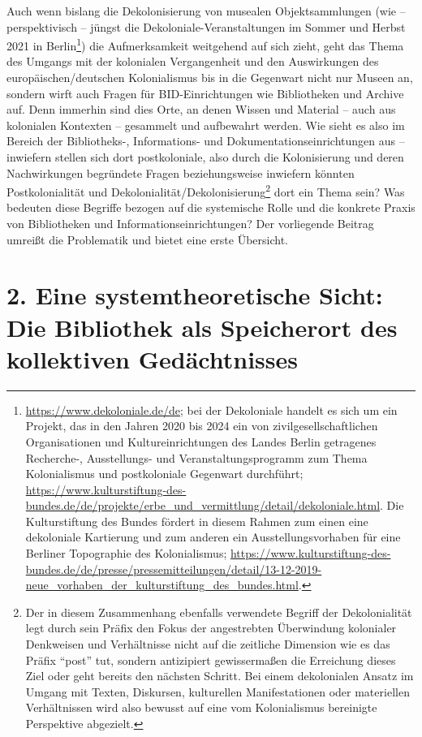 \documentclass[a4paper,
fontsize=11pt,
oneside,
numbers=noperiodatend,
parskip=half-,
bibliography=totoc,
final
]{scrartcl}
\begin{document}
Auch wenn bislang die Dekolonisierung von musealen Objektsammlungen (wie
-- perspektivisch -- jüngst die Dekoloniale-Veranstaltungen im Sommer
und Herbst 2021 in Berlin\footnote{\url{https://www.dekoloniale.de/de};
  bei der Dekoloniale handelt es sich um ein Projekt, das in den Jahren
  2020 bis 2024 ein von zivilgesellschaftlichen Organisationen und
  Kultureinrichtungen des Landes Berlin getragenes Recherche-,
  Ausstellungs- und Veranstaltungsprogramm zum Thema Kolonialismus und
  postkoloniale Gegenwart durchführt;
  \url{https://www.kulturstiftung-des-bundes.de/de/projekte/erbe_und_vermittlung/detail/dekoloniale.html}.
  Die Kulturstiftung des Bundes fördert in diesem Rahmen zum einen eine
  dekoloniale Kartierung und zum anderen ein Ausstellungsvorhaben für
  eine Berliner Topographie des Kolonialismus;
  \url{https://www.kulturstiftung-des-bundes.de/de/presse/pressemitteilungen/detail/13-12-2019-neue_vorhaben_der_kulturstiftung_des_bundes.html}.})
die Aufmerksamkeit weitgehend auf sich zieht, geht das Thema des Umgangs
mit der kolonialen Vergangenheit und den Auswirkungen des
europäischen/deutschen Kolonialismus bis in die Gegenwart nicht nur
Museen an, sondern wirft auch Fragen für BID-Einrichtungen wie
Bibliotheken und Archive auf. Denn immerhin sind dies Orte, an denen
Wissen und Material -- auch aus kolonialen Kontexten -- gesammelt und
aufbewahrt werden. Wie sieht es also im Bereich der Bibliotheks-,
Informations- und Dokumentationseinrichtungen aus -- inwiefern stellen
sich dort postkoloniale, also durch die Kolonisierung und deren
Nachwirkungen begründete Fragen beziehungsweise inwiefern könnten
Postkolonialität und Dekolonialität/Dekolonisierung\footnote{Der in
  diesem Zusammenhang ebenfalls verwendete Begriff der Dekolonialität
  legt durch sein Präfix den Fokus der angestrebten Überwindung
  kolonialer Denkweisen und Verhältnisse nicht auf die zeitliche
  Dimension wie es das Präfix \enquote{post} tut, sondern antizipiert
  gewissermaßen die Erreichung dieses Ziel oder geht bereits den
  nächsten Schritt. Bei einem dekolonialen Ansatz im Umgang mit Texten,
  Diskursen, kulturellen Manifestationen oder materiellen Verhältnissen
  wird also bewusst auf eine vom Kolonialismus bereinigte Perspektive
  abgezielt.} dort ein Thema sein? Was bedeuten diese Begriffe bezogen
auf die systemische Rolle und die konkrete Praxis von Bibliotheken und
Informationseinrichtungen? Der vorliegende Beitrag umreißt die
Problematik und bietet eine erste Übersicht.

\hypertarget{eine-systemtheoretische-sicht-die-bibliothek-als-speicherort-des-kollektiven-geduxe4chtnisses}{%
\section{2. Eine systemtheoretische Sicht: Die Bibliothek als
Speicherort des kollektiven
Gedächtnisses}\label{eine-systemtheoretische-sicht-die-bibliothek-als-speicherort-des-kollektiven-geduxe4chtnisses}}
\end{document}
